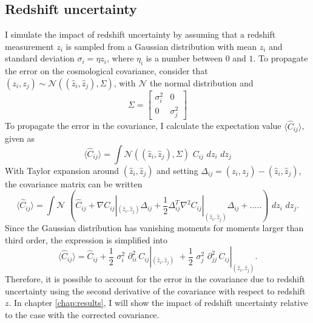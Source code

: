 \subsection{Redshift uncertainty} \label{meth_sec:z_uncertainty}
I simulate the impact of redshift uncertainty by assuming that a redshift measurement $z_i$ is sampled from a Gaussian distribution with mean $z_i$ and standard deviation $\sigma_i = \eta z_i$, where $\eta_i$ is a number between $0$ and $1$. To propagate the error on the cosmological covariance, consider that $(z_i, z_j)  \sim \mathcal{N}((\hat{z}_i, \hat{z}_j) , \Sigma)$, with $\mathcal{N}$ the normal distribution and
\begin{equation}
    \Sigma = \begin{bmatrix}
    \sigma_i^2 & 0 \\
    0 & \sigma_j^2
    \end{bmatrix}
\end{equation}
To propagate the error in the covariance, I calculate the expectation value $\langle \hat{C}_{ij} \rangle$, given as
\begin{equation}
    \langle \hat{C}_{ij} \rangle = \int \mathcal{N}((\hat{z}_i, \hat{z}_j) , \Sigma) \, \, C_{ij} \, \,dz_i \, \, dz_j
\end{equation}
With Taylor expansion around $(\hat{z}_i, \hat{z}_j)$ and setting $\Delta_{ij} = (z_i, z_j) - (\hat{z}_i, \hat{z}_j)$, the covariance matrix can be written
\begin{equation}
    \langle \hat{C}_{ij} \rangle = \int \mathcal{N} \, \, \left(\hat{C}_{ij} + \nabla C_{ij}|_{(\hat{z}_i, \hat{z}_j)} \Delta_{ij} + \frac{1}{2} \Delta_{ij}^{T} \nabla^2 C_{ij}|_{(\hat{z}_i, \hat{z}_j)}\Delta_{ij} + .....\right)\, \,dz_i \, \, dz_j.
\end{equation}
Since the Gaussian distribution has vanishing moments for moments larger than third order, the expression is simplified into
\begin{equation} \label{eq:cov_z_uncertainty}
    \langle \hat{C}_{ij} \rangle = \hat{C}_{ij} + \frac{1}{2} \, \, \sigma_{i}^2 \, \, \partial^2_{ii} \, C_{ij}|_{(\hat{z}_i, \hat{z}_j)} \, \, + \frac{1}{2} \, \, \sigma_{j}^2 \, \, \partial^2_{jj} \, C_{ij}|_{(\hat{z}_i, \hat{z}_j)}.
\end{equation}
Therefore, it is possible to account for the error in the covariance due to redshift uncertainty using the second derivative of the covariance with respect to redshift $z$. In chapter \ref{chap:results}, I will show the impact of redshift uncertainty relative to the case with the corrected covariance.




